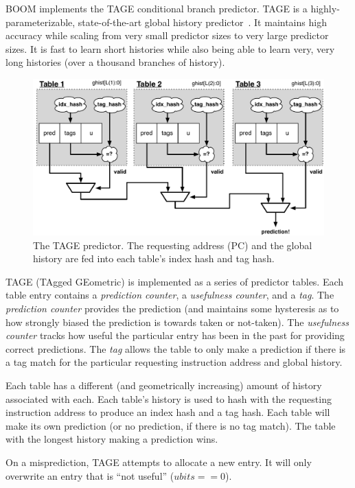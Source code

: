 BOOM implements the TAGE conditional branch predictor. TAGE is a highly-parameterizable, state-of-the-art global history predictor~\cite{seznec2006case, seznec2011new}.  It maintains high accuracy while scaling from very small predictor sizes to very large predictor sizes. It is fast to learn short histories while also being able to learn very, very long histories (over a thousand branches of history).  


\begin{figure}[ht]
	\centering
	\centerline{\includegraphics[scale =0.80] {figures/tage}}
	\caption{ \small The TAGE predictor. The requesting address (PC) and the global history are fed into each table's index hash and tag hash.}
	\label{fig:tage}
\end{figure}


TAGE (TAgged GEometric) is implemented as a series of predictor tables. Each table entry contains a {\em prediction counter}, a {\em usefulness counter}, and a {\em tag}. The {\em prediction counter} provides the prediction (and maintains some hysteresis as to how strongly biased the prediction is towards taken or not-taken). The {\em usefulness counter} tracks how useful the particular entry has been in the past for providing correct predictions.  The {\em tag} allows the table to only make a prediction if there is a tag match for the particular requesting instruction address and global history.

Each table has a different (and geometrically increasing) amount of history associated with each.  Each table's history is used to hash with the requesting instruction address to produce an index hash and a tag hash.  Each table will make its own prediction (or no prediction, if there is no tag match).  The table with the longest history making a prediction wins. 

On a misprediction, TAGE attempts to allocate a new entry. It will only overwrite an entry that is ``not useful'' ($ubits == 0$). 

